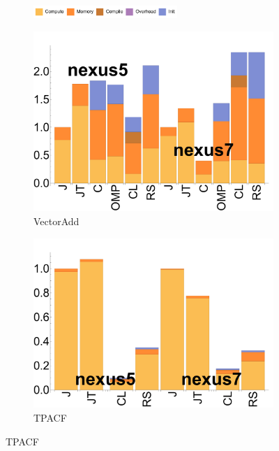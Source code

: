 \begin{figure}[tp]
  \centering

  \begin{subfigure}[b]{0.5\textwidth}
          \centering
          \includegraphics[width=0.6\textwidth]{data/legend.pdf}
  \end{subfigure}

  \begin{subfigure}[b]{0.24\textwidth}
      \centering
      \includegraphics[width=\textwidth]{data/bbattery_vectoradd.pdf}
      \caption{VectorAdd}\label{fig:b_vectoradd}
  \end{subfigure}%

  \begin{subfigure}[b]{0.24\textwidth}
      \centering
      \includegraphics[width=\textwidth]{data/bbattery_tpacf.pdf}
      \caption{TPACF} \label{fig:b_TPACF}
  \end{subfigure}%


\end{figure}
